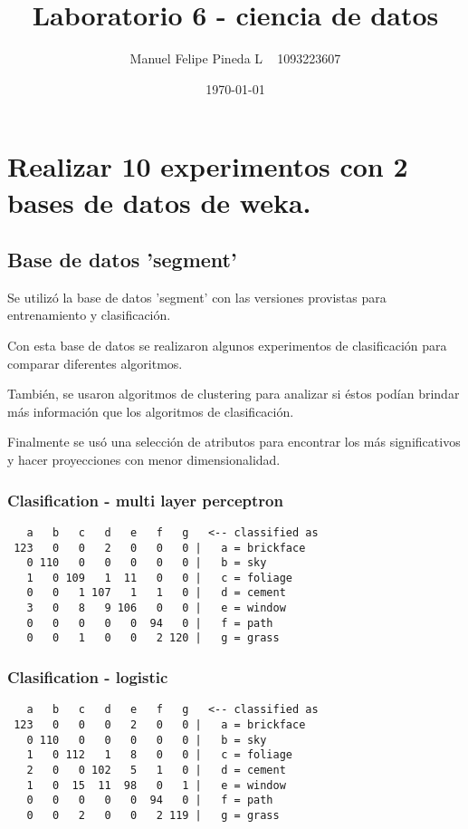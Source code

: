 \documentclass[a4paper]{article}
\title{Laboratorio 6 - ciencia de datos}
\author{Manuel Felipe Pineda L ~ 1093223607}
\date{\today}
\begin{document}
\maketitle

\section{Realizar 10 experimentos con 2 bases de datos de weka.}

\subsection{Base de datos 'segment'}
Se utilizó la base de datos 'segment' con las versiones
provistas para entrenamiento y clasificación.

Con esta base de datos se realizaron algunos experimentos
de clasificación para comparar diferentes algoritmos.

También, se usaron algoritmos de clustering para analizar
si éstos podían brindar más información que los algoritmos
de clasificación.

Finalmente se usó una selección de atributos para
encontrar los más significativos y hacer proyecciones
con menor dimensionalidad.

\subsubsection{Clasification - multi layer perceptron}

\begin{verbatim}
   a   b   c   d   e   f   g   <-- classified as
 123   0   0   2   0   0   0 |   a = brickface
   0 110   0   0   0   0   0 |   b = sky
   1   0 109   1  11   0   0 |   c = foliage
   0   0   1 107   1   1   0 |   d = cement
   3   0   8   9 106   0   0 |   e = window
   0   0   0   0   0  94   0 |   f = path
   0   0   1   0   0   2 120 |   g = grass
\end{verbatim}

\subsubsection{Clasification - logistic}
\begin{verbatim}
   a   b   c   d   e   f   g   <-- classified as
 123   0   0   0   2   0   0 |   a = brickface
   0 110   0   0   0   0   0 |   b = sky
   1   0 112   1   8   0   0 |   c = foliage
   2   0   0 102   5   1   0 |   d = cement
   1   0  15  11  98   0   1 |   e = window
   0   0   0   0   0  94   0 |   f = path
   0   0   2   0   0   2 119 |   g = grass
\end{verbatim}
\end{document}
